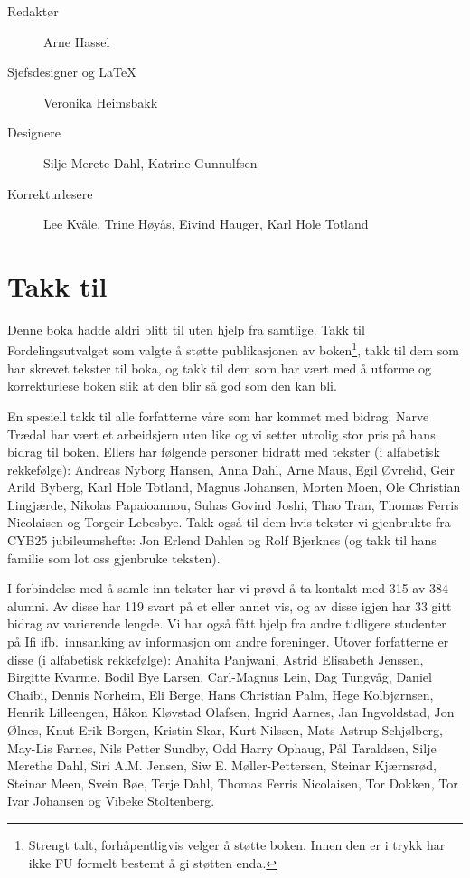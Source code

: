\begin{description}
	\item[Redaktør] Arne Hassel
	\item[Sjefsdesigner og \LaTeX{}] Veronika Heimsbakk
	\item[Designere] Silje Merete Dahl, Katrine Gunnulfsen
	\item[Korrekturlesere] Lee Kvåle, Trine Høyås, Eivind Hauger, Karl Hole Totland
\end{description}

\section*{Takk til}

Denne boka hadde aldri blitt til uten hjelp fra samtlige. Takk til Fordelingsutvalget som valgte å støtte publikasjonen av boken\footnote{Strengt talt, forhåpentligvis velger å støtte boken. Innen den er i trykk har ikke FU formelt bestemt å gi støtten enda.}, takk til dem som har skrevet tekster til boka, og takk til dem som har vært med å utforme og korrekturlese boken slik at den blir så god som den kan bli.

En spesiell takk til alle forfatterne våre som har kommet med bidrag. Narve Trædal har vært et arbeidsjern uten like og vi setter utrolig stor pris på hans bidrag til boken. Ellers har følgende personer bidratt med tekster (i alfabetisk rekkefølge): Andreas Nyborg Hansen, Anna Dahl, Arne Maus, Egil Øvrelid, Geir Arild Byberg, Karl Hole Totland, Magnus Johansen, Morten Moen, Ole Christian Lingjærde, Nikolas Papaioannou, Suhas Govind Joshi, Thao Tran, Thomas Ferris Nicolaisen og Torgeir Lebesbye. Takk også til dem hvis tekster vi gjenbrukte fra CYB25 jubileumshefte: Jon Erlend Dahlen og Rolf Bjerknes (og takk til hans familie som lot oss gjenbruke teksten).

I forbindelse med å samle inn tekster har vi prøvd å ta kontakt med 315 av 384 alumni. Av disse har 119 svart på et eller annet vis, og av disse igjen har 33 gitt bidrag av varierende lengde. Vi har også fått hjelp fra andre tidligere studenter på Ifi ifb.~innsanking av informasjon om andre foreninger. Utover forfatterne er disse (i alfabetisk rekkefølge): Anahita Panjwani, Astrid Elisabeth Jenssen, Birgitte Kvarme, Bodil Bye Larsen, Carl-Magnus Lein, Dag Tungvåg, Daniel Chaibi, Dennis Norheim, Eli Berge, Hans Christian Palm, Hege Kolbjørnsen, Henrik Lilleengen, Håkon Kløvstad Olafsen, Ingrid Aarnes, Jan Ingvoldstad, Jon Ølnes, Knut Erik Borgen, Kristin Skar, Kurt Nilssen, Mats Astrup Schjølberg, May-Lis Farnes, Nils Petter Sundby, Odd Harry Ophaug, Pål Taraldsen, Silje Merethe Dahl, Siri A.M. Jensen, Siw E. Møller-Pettersen, Steinar Kjærnsrød, Steinar Meen, Svein Bøe, Terje Dahl, Thomas Ferris Nicolaisen, Tor Dokken, Tor Ivar Johansen og Vibeke Stoltenberg.

